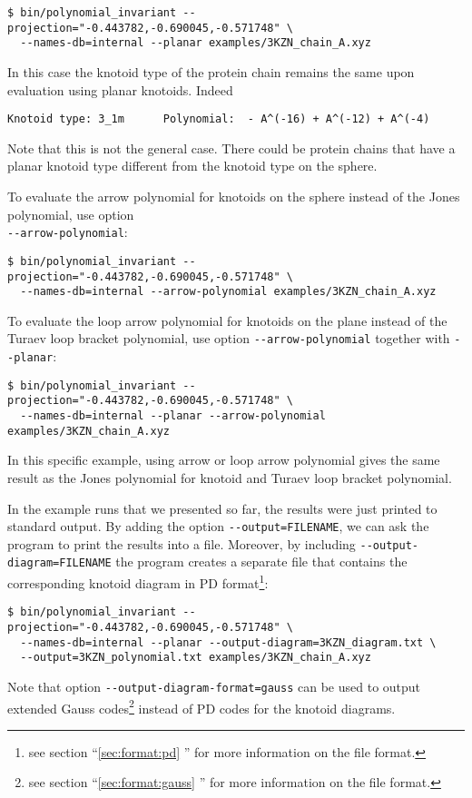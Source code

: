 \begin{lstlisting}
$ bin/polynomial_invariant --projection="-0.443782,-0.690045,-0.571748" \
  --names-db=internal --planar examples/3KZN_chain_A.xyz
\end{lstlisting}
In this case the knotoid type of the protein chain remains the same upon evaluation using planar knotoids. Indeed
\begin{lstlisting}
Knotoid type: 3_1m      Polynomial:  - A^(-16) + A^(-12) + A^(-4)
\end{lstlisting}
Note that this is not the general case. There could be protein chains that have a planar knotoid type different from the knotoid type on the sphere.

To evaluate the arrow polynomial for knotoids on the sphere instead of the Jones polynomial, use option\\
\lstinline{--arrow-polynomial}:
\begin{lstlisting}
$ bin/polynomial_invariant --projection="-0.443782,-0.690045,-0.571748" \
  --names-db=internal --arrow-polynomial examples/3KZN_chain_A.xyz
\end{lstlisting}
To evaluate the loop arrow polynomial for knotoids on the plane instead of the Turaev loop bracket polynomial, use option \lstinline{--arrow-polynomial} together with \lstinline{--planar}:
\begin{lstlisting}
$ bin/polynomial_invariant --projection="-0.443782,-0.690045,-0.571748" \
  --names-db=internal --planar --arrow-polynomial examples/3KZN_chain_A.xyz
\end{lstlisting}
In this specific example, using arrow or loop arrow polynomial gives the same result as the Jones polynomial for knotoid and Turaev loop bracket polynomial.


In the example runs that we presented so far, the results were just printed to standard output. By adding the option \lstinline{--output=FILENAME}, we can ask the program to print the results into a file. Moreover, by including \lstinline{--output-diagram=FILENAME} the program creates a separate file that contains the corresponding knotoid diagram in PD format\footnote{see section ``\ref{sec:format:pd} '' for more information on the file format.}:
\begin{lstlisting}
$ bin/polynomial_invariant --projection="-0.443782,-0.690045,-0.571748" \
  --names-db=internal --planar --output-diagram=3KZN_diagram.txt \ 
  --output=3KZN_polynomial.txt examples/3KZN_chain_A.xyz
\end{lstlisting}
Note that option \lstinline{--output-diagram-format=gauss} can be used to output extended Gauss codes\footnote{see section ``\ref{sec:format:gauss} '' for more information on the file format.} instead of PD codes for the knotoid diagrams.

